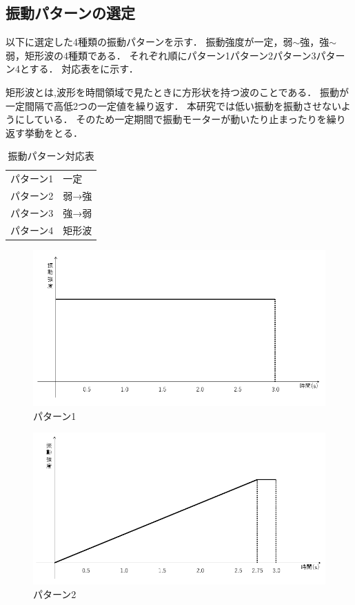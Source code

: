 \newpage
\subsection{振動パターンの選定}
以下に選定した4種類の振動パターンを示す．
振動強度が一定，弱$\sim$強，強$\sim$弱，矩形波の4種類である．
それぞれ順にパターン1パターン2パターン3パターン4とする．
対応表をに示す．

矩形波とは,波形を時間領域で見たときに方形状を持つ波のことである．
振動が一定間隔で高低2つの一定値を繰り返す．
本研究では低い振動を振動させないようにしている．
そのため一定期間で振動モーターが動いたり止まったりを繰り返す挙動をとる．

\begin{table}[H]
    \caption{振動パターン対応表}
    \centering
    \begin{tabular}{l|l}
    \hline
    \hline
    パターン1 & 一定 \\
    パターン2 & 弱→強 \\
    パターン3 & 強→弱 \\
    パターン4 & 矩形波 \\
    \hline
    \end{tabular}
    \label{tab;sindou}
\end{table}


\begin{figure}[h]
\centering
\includegraphics[clip,width=14cm]{./fig/patarn1.png}
\caption{パターン1}\label{patarn1}
\end{figure}

\begin{figure}[h]
\centering
\includegraphics[clip,width=14cm]{./fig/patarn2.png}
\caption{パターン2}\label{patarn2}
\end{figure}

